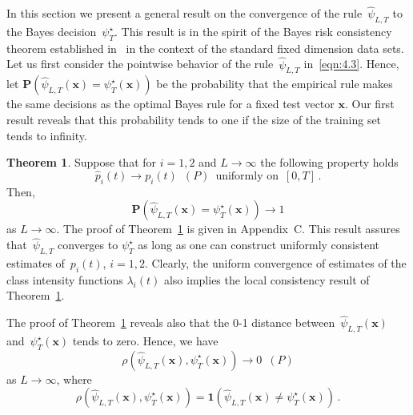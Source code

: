 \documentclass[lettersize,journal,onecolumn]{IEEEtran}
\theoremstyle{definition}
\newtheorem{theorem}{Theorem}
\newcommand{\indicator}[1]{{\mathbf{1}}\left( #1 \right)}
\begin{document}
In this section we present a general result on the convergence of the 
rule~$\widehat{\psi}_{L,T}$ to the Bayes decision~$\psi_{T}^{\star}$. This result is 
in the spirit of the Bayes risk consistency theorem established 
in~\cite{greblicki1978asymptotically} in the context of the standard fixed dimension 
data sets. Let us first consider the pointwise behavior of the 
rule~$\widehat{\psi}_{L,T}$ in~\eqref{eqn:4.3}. Hence, let \mbox{$
	\mathbf{P}\left(\widehat{\psi}_{L,T}(\mathbf{x}) = \psi_{T}^{\star}(\mathbf{x})\right)
	$} be the probability that the empirical rule makes the same decisions as the optimal 
Bayes rule for a fixed test vector $\mathbf{x}$. Our first result reveals that this 
probability tends to one if the size of the training set tends to infinity.
\begin{theorem}
	\label{theorem:5}
	Suppose that  for $i = 1,2$ and $L\to\infty$ the following property holds
	\begin{equation}
		\widehat{p}_{i}(t) \to p_{i}(t)
		\enspace 
		(P)
		\enspace 
		\text{uniformly on}
		\enspace
		[0, T]
		\label{eqn:4.4}\,.
	\end{equation}
	Then,
	\begin{equation*}
		\mathbf{P}\left(\widehat{\psi}_{L,T}(\mathbf{x}) =
		\psi_{T}^{\star}(\mathbf{x})\right) \to 1
	\end{equation*}
	as $L\to\infty$. The proof of Theorem~\ref{theorem:5} is given in Appendix~C.
	This result assures that~$\widehat{\psi}_{L,T}$ converges to $\psi_{T}^{\star}$ as 
	long as one can construct uniformly consistent estimates 
	of~$p_{i}(t)$, \enspace$i = 1,2$. Clearly, the uniform convergence of estimates of 
	the class intensity functions $\lambda_{i}(t)$ also	implies the local consistency 
	result of Theorem~\ref{theorem:5}.
\end{theorem} 
The proof of Theorem~\ref{theorem:5} 
reveals also that the 0-1 distance between~$\widehat{\psi}_{L,T}(\mathbf{x})$ 
and~$\psi_{T}^{\star}(\mathbf{x})$ tends to zero. Hence, we have
\begin{equation}
	\rho(
	\widehat{\psi}_{L,T}(\mathbf{x}), \psi_{T}^{\star}(\mathbf{x})
	) \to 0
	\enspace (P)
	\label{eqn:4.5}
\end{equation}
as $L\to\infty$, where 
\begin{equation*}
	\rho(
	\widehat{\psi}_{L,T}(\mathbf{x}), \psi_{T}^{\star}(\mathbf{x})
	) = \indicator{
		\widehat{\psi}_{L,T}(\mathbf{x}) \neq \psi_{T}^{\star}(\mathbf{x})
	}
	\,.
\end{equation*}
\end{document}
